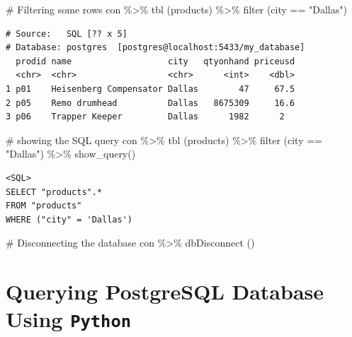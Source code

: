 \documentclass[
  letterpaper,
  DIV=11,
  numbers=noendperiod]{scrreprt}
\newenvironment{Shaded}{\begin{snugshade}}{\end{snugshade}}
\newcommand{\CommentTok}[1]{\textcolor[rgb]{0.37,0.37,0.37}{#1}}
\newcommand{\FunctionTok}[1]{\textcolor[rgb]{0.28,0.35,0.67}{#1}}
\newcommand{\NormalTok}[1]{\textcolor[rgb]{0.00,0.23,0.31}{#1}}
\newcommand{\SpecialCharTok}[1]{\textcolor[rgb]{0.37,0.37,0.37}{#1}}
\newcommand{\StringTok}[1]{\textcolor[rgb]{0.13,0.47,0.30}{#1}}
\begin{document}
\begin{Shaded}
\begin{Highlighting}[]
\CommentTok{\# Filtering some rows}
\NormalTok{con }\SpecialCharTok{\%\textgreater{}\%} 
  \FunctionTok{tbl}\NormalTok{ (}\StringTok{\textquotesingle{}products\textquotesingle{}}\NormalTok{) }\SpecialCharTok{\%\textgreater{}\%}
  \FunctionTok{filter}\NormalTok{ (city }\SpecialCharTok{==} \StringTok{"Dallas"}\NormalTok{)}
\end{Highlighting}
\end{Shaded}

\begin{verbatim}
# Source:   SQL [?? x 5]
# Database: postgres  [postgres@localhost:5433/my_database]
  prodid name                   city   qtyonhand priceusd
  <chr>  <chr>                  <chr>      <int>    <dbl>
1 p01    Heisenberg Compensator Dallas        47     67.5
2 p05    Remo drumhead          Dallas   8675309     16.6
3 p06    Trapper Keeper         Dallas      1982      2  
\end{verbatim}

\begin{Shaded}
\begin{Highlighting}[]
\CommentTok{\# showing the SQL query}
\NormalTok{con }\SpecialCharTok{\%\textgreater{}\%} 
  \FunctionTok{tbl}\NormalTok{ (}\StringTok{\textquotesingle{}products\textquotesingle{}}\NormalTok{) }\SpecialCharTok{\%\textgreater{}\%}
  \FunctionTok{filter}\NormalTok{ (city }\SpecialCharTok{==} \StringTok{"Dallas"}\NormalTok{) }\SpecialCharTok{\%\textgreater{}\%}
  \FunctionTok{show\_query}\NormalTok{()}
\end{Highlighting}
\end{Shaded}

\begin{verbatim}
<SQL>
SELECT "products".*
FROM "products"
WHERE ("city" = 'Dallas')
\end{verbatim}

\begin{Shaded}
\begin{Highlighting}[]
\CommentTok{\# Disconnecting the database }
\NormalTok{con }\SpecialCharTok{\%\textgreater{}\%} \FunctionTok{dbDisconnect}\NormalTok{ ()}
\end{Highlighting}
\end{Shaded}

\section{\texorpdfstring{Querying PostgreSQL Database Using
\texttt{Python}}{Querying PostgreSQL Database Using Python}}\label{querying-postgresql-database-using-python}
\end{document}
